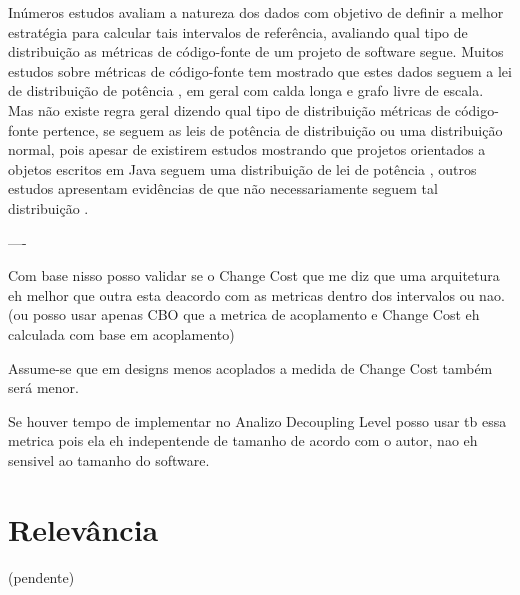 Inúmeros estudos avaliam a natureza dos dados com objetivo de definir a melhor
estratégia para calcular tais intervalos de referência, avaliando qual tipo de
distribuição as métricas de código-fonte de um projeto de software segue.
Muitos estudos sobre métricas de código-fonte tem mostrado que estes dados
seguem a lei de distribuição de potência \cite{Clauset2009}, em geral com calda
longa e grafo livre de escala. Mas não existe regra geral dizendo qual tipo de
distribuição métricas de código-fonte pertence, se seguem as leis de potência
de distribuição ou uma distribuição normal, pois apesar de existirem estudos
mostrando que projetos orientados a objetos escritos em Java seguem uma
distribuição de lei de potência \cite{Wheeldon2003, Potanin2005, Concas2007,
Ferreira2009, Yao2009}, outros estudos apresentam evidências de que não
necessariamente seguem tal distribuição \cite{Baxter2006, Lanza2007,
Herraiz2011, Herraiz2012}.

----

Com base nisso posso validar se o Change Cost que me diz que uma arquitetura
eh melhor que outra esta deacordo com as metricas dentro dos intervalos ou nao.
(ou posso usar apenas CBO que a metrica de acoplamento e Change Cost eh calculada com base em acoplamento)

Assume-se que em designs menos acoplados a medida de Change Cost também será menor.


Se houver tempo de implementar no Analizo Decoupling Level posso usar tb essa metrica pois
ela eh indepentende de tamanho de acordo com o autor, nao eh sensivel ao tamanho do software.

\section{Relevância}

(pendente)


